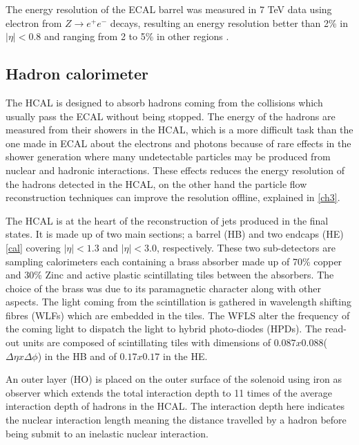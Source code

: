 The energy resolution of the ECAL barrel was measured in 7 TeV data using electron from $Z \rightarrow e^+e^-$ decays, resulting an energy resolution better than 2\% in $|\eta|<0.8$ and ranging from 2 to 5\% in other regions \cite{ecalm}. 

\subsection{Hadron calorimeter}

The HCAL\cite{CMS:1997xji} is designed to absorb hadrons coming from the collisions which usually pass the ECAL without being stopped. The energy of the hadrons are measured from their showers in the HCAL, which is a more difficult task than the one made in ECAL about the electrons and photons because of rare effects in the shower generation where many undetectable particles may be produced from nuclear and hadronic interactions. These effects reduces the energy resolution of the hadrons detected in the HCAL, on the other hand the particle flow reconstruction techniques can improve the resolution offline, explained in \autoref{ch3}.

The HCAL is at the heart of the reconstruction of jets produced in the final states. It is made up of two main sections; a barrel (HB) and two endcaps (HE) \autoref{cal} covering $|\eta|<1.3$ and $|\eta|<3.0$, respectively. These two sub-detectors are sampling calorimeters each containing a brass absorber made up of 70\% copper and 30\% Zinc and active plastic scintillating tiles between the absorbers. The choice of the brass was due to its paramagnetic character along with other aspects. The light coming from the scintillation is gathered in wavelength shifting fibres (WLFs) which are embedded in the tiles. The WFLS alter the frequency of the coming light to dispatch the light to hybrid photo-diodes (HPDs). The read-out units are composed of scintillating tiles with dimensions of $0.087x0.088$($\Delta\eta x\Delta\phi$) in the HB and of $0.17x0.17$ in the HE.

An outer layer (HO) is placed on the outer surface of the solenoid using iron as observer which extends the total interaction depth to 11 times of the average interaction depth of hadrons in the HCAL. The interaction depth here indicates the nuclear interaction length meaning the distance travelled by a hadron before being submit to an inelastic nuclear interaction.

